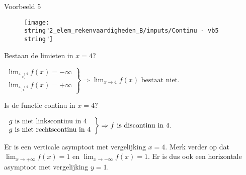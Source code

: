 \medskip{}


\noindent Voorbeeld 5

\begin{figure}[h]
	\centering
	\texttt{[image: \\string"2\_elem\_rekenvaardigheden\_B/inputs/Continu - vb5\\string"]}
\end{figure}

Bestaan de limieten in $x=4$?

\begin{math}
\left. \begin{array}{l}
{\displaystyle\lim_{\overset{x\rightarrow4}{<}}}f(x)=-\infty \\
{\displaystyle \lim_{\overset{x\rightarrow4}{>}}}f(x)=+\infty
\end{array}
\right\}
\Rightarrow{\displaystyle \lim_{x\to4}}f(x) \text{ bestaat niet}.
\end{math}

Is de functie continu in $x=4$?

\begin{math}
\centering
\left. \begin{array}{l}
g \text{ is niet linkscontinu in }4\\
g \text{ is niet rechtscontinu in }4
\end{array}
\right\}
\Rightarrow f \text{ is discontinu in }4.
\end{math}

Er is een verticale asymptoot met vergelijking $x=4$.
Merk verder op dat ${\displaystyle\lim_{x\rightarrow+\infty}}f(x)=1$ en ${\displaystyle\lim_{x\rightarrow-\infty}}f(x)=1$.
Er is dus ook een horizontale asymptoot met vergelijking $y=1$.


